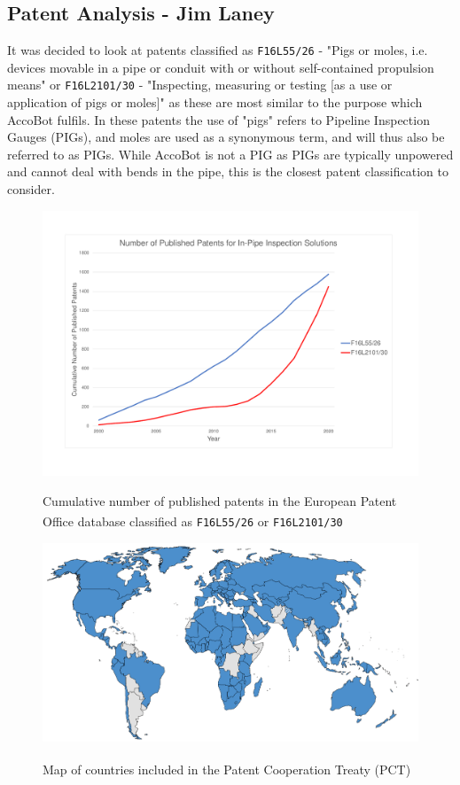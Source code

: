 \documentclass[11pt]{article}		%
\newlength{\imageheight}	 %
\newcommand{\supercite}[1]{\textsuperscript{\cite{#1}}}		%
\begin{document}
	\subsection[Patent Analysis]{Patent Analysis - Jim Laney}

		It was decided to look at patents classified as \verb|F16L55/26| - "Pigs or moles, i.e. devices movable in a pipe or conduit with or without self-contained propulsion means" or \verb|F16L2101/30| - "Inspecting, measuring or testing [as a use or application of pigs or moles]" as these are most similar to the purpose which AccoBot fulfils.
		In these patents the use of "pigs" refers to Pipeline Inspection Gauges (PIGs), and moles are used as a synonymous term, and will thus also be referred to as PIGs.
		While AccoBot is not a PIG as PIGs are typically unpowered and cannot deal with bends in the pipe, this is the closest patent classification to consider.
		\begin{figure}[h]
			\centering
			\begin{multicols}{2}
				\includegraphics[height=\imageheight]{patentGraph}
				\caption{Cumulative number of published patents in the European Patent Office database classified as \texttt{F16L55/26}\supercite{patent26} or \texttt{F16L2101/30}\supercite{patent30}}
				\label{patentGraph}
				\columnbreak
				\includegraphics[height=0.25\textwidth]{pctMap}
				\caption{Map of countries included in the Patent Cooperation Treaty (PCT)\supercite{pct2020states}}
				\label{pctMap}
			\end{multicols}
		\end{figure}
\end{document}
